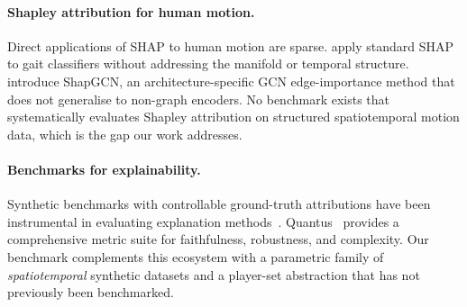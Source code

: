 \paragraph{Shapley attribution for human motion.}
Direct applications of SHAP to human motion are sparse.
\citet{tempel2025choose, auletta2023predicting} apply standard SHAP to
gait classifiers without addressing the manifold or temporal structure.
\citet{tempel2025explaining} introduce ShapGCN, an architecture-specific
GCN edge-importance method that does not generalise to non-graph encoders.
No benchmark exists that systematically evaluates Shapley attribution on
structured spatiotemporal motion data, which is the gap our work addresses.

\paragraph{Benchmarks for explainability.}
Synthetic benchmarks with controllable ground-truth attributions
have been instrumental in evaluating explanation
methods~\citep{arras2022clevr, hedstrom2023quantus, Yang2019BenchmarkingAM}.
Quantus~\citep{hedstrom2023quantus} provides a comprehensive metric suite for
faithfulness, robustness, and complexity.  Our benchmark complements this
ecosystem with a parametric family of \emph{spatiotemporal} synthetic datasets
and a player-set abstraction that has not previously been benchmarked.

